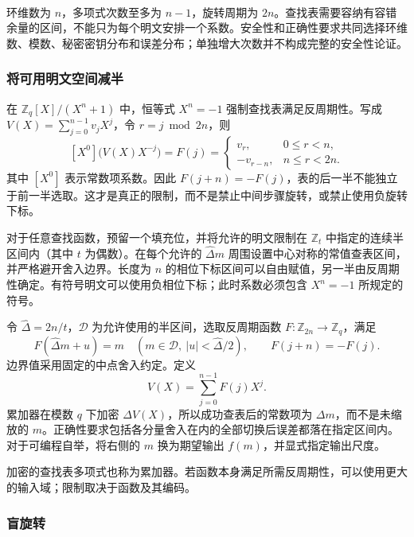 $ $

环维数为 $n$，多项式次数至多为 $n-1$，旋转周期为 $2n$。查找表需要容纳有容错余量的区间，不能只为每个明文安排一个系数。安全性和正确性要求共同选择环维数、模数、秘密密钥分布和误差分布；单独增大次数并不构成完整的安全性论证。



\subsubsection{将可用明文空间减半}
\label{subsec:tfhe-zero-padding} 

在 $\mathbb Z_q[X]/(X^n+1)$ 中，恒等式 $X^n=-1$ 强制查找表满足反周期性。写成 $V(X)=\sum_{j=0}^{n-1}v_jX^j$，令 $r=j\bmod 2n$，则
\[
[X^0]\bigl(V(X)X^{-j}\bigr)=F(j)=
\begin{cases}
v_r,&0\leq r<n,\\
-v_{r-n},&n\leq r<2n.
\end{cases}
\]
其中 $[X^0]$ 表示常数项系数。因此 $F(j+n)=-F(j)$，表的后一半不能独立于前一半选取。这才是真正的限制，而不是禁止中间步骤旋转，或禁止使用负旋转下标。

对于任意查找函数，预留一个填充位，并将允许的明文限制在 $\mathbb Z_t$ 中指定的连续半区间内（其中 $t$ 为偶数）。在每个允许的 $\hat\Delta m$ 周围设置中心对称的常值查表区间，并严格避开舍入边界。长度为 $n$ 的相位下标区间可以自由赋值，另一半由反周期性确定。有符号明文可以使用负相位下标；此时系数必须包含 $X^n=-1$ 所规定的符号。

\begin{tcolorbox}[title={\textbf{\tboxlabel{\ref*{subsec:tfhe-zero-padding}} 查找表多项式 $\bm{V(X)}$ 的结构}}]
令 $\hat\Delta=2n/t$，$\mathcal D$ 为允许使用的半区间，选取反周期函数 $F:\mathbb Z_{2n}\to\mathbb Z_q$，满足
\[
F(\hat\Delta m+u)=m\quad(m\in\mathcal D,\ |u|<\hat\Delta/2),\qquad F(j+n)=-F(j).
\]
边界值采用固定的中点舍入约定。定义
\[
V(X)=\sum_{j=0}^{n-1}F(j)X^j.
\]
累加器在模数 $q$ 下加密 $\Delta V(X)$，所以成功查表后的常数项为 $\Delta m$，而不是未缩放的 $m$。正确性要求包括各分量舍入在内的全部切换后误差都落在指定区间内。对于可编程自举，将右侧的 $m$ 换为期望输出 $f(m)$，并显式指定输出尺度。
\end{tcolorbox}

加密的查找表多项式也称为累加器。若函数本身满足所需反周期性，可以使用更大的输入域；限制取决于函数及其编码。

\subsubsection{盲旋转}
\label{subsec:bootstrapping-blind-rotation} 


